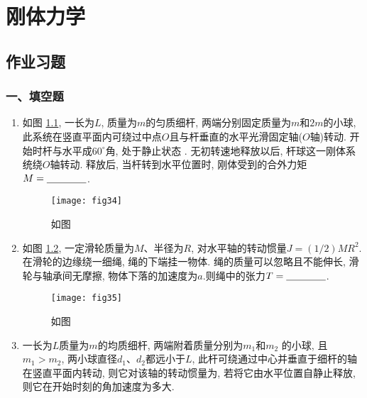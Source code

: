 \chapter{刚体力学}
\section{作业习题}
\subsection*{一、填空题}
\begin{enumerate}
    \item 如图 \ref{fig:34}, 一长为$L$, 质量为$m$的匀质细杆, 两端分别固定质量为$m$和$2m$的小球,
    此系统在竖直平面内可绕过中点$O$且与杆垂直的水平光滑固定轴($O$轴)转动. 
    开始时杆与水平成$60^\circ$角, 处于静止状态 . 
    无初转速地释放以后, 杆球这一刚体系统绕$O$轴转动. 
    释放后, 当杆转到水平位置时, 刚体受到的合外力矩$M=\nl$.
    \begin{figure}[h]
        \centering
        \texttt{[image: fig34]}
            \caption{如图}\label{fig:34}
    \end{figure}
    \item 如图 \ref{fig:35}, 一定滑轮质量为$M$、半径为$R$, 对水平轴的转动惯量$J=(1/2)MR^2$.
    在滑轮的边缘绕一细绳, 绳的下端挂一物体. 
    绳的质量可以忽略且不能伸长, 滑轮与轴承间无摩擦, 
    物体下落的加速度为$a$.则绳中的张力$T=\nl$.
    \begin{figure}[h]
        \centering
        \texttt{[image: fig35]}
            \caption{如图}\label{fig:35}
    \end{figure}
    \item 一长为$L$质量为$m$的均质细杆, 两端附着质量分别为$m_1$和$m_2$
    的小球, 且$m_1>m_2$, 两小球直径$d_1$、$d_2$都远小于$L$, 
    此杆可绕通过中心并垂直于细杆的轴在竖直平面内转动, 
    则它对该轴的转动惯量为\nl, 若将它由水平位置自静止释放, 
    则它在开始时刻的角加速度为多大\nl.


\end{enumerate}
